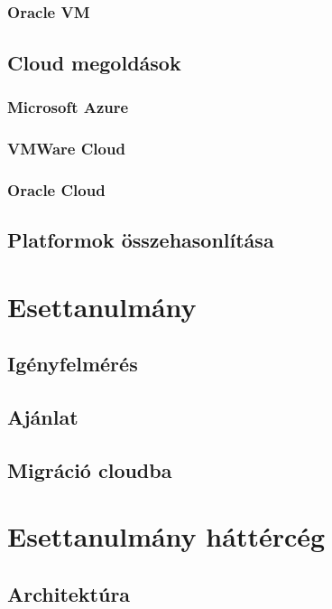 \documentclass[12pt,oneside,justify]{book}
\begin{document}
\subsection{Oracle\textsuperscript{\textregistered} VM}
\noindent

\section{Cloud megoldások}
\subsection{Microsoft Azure}
\noindent

\subsection{VMWare Cloud}
\noindent

\subsection{Oracle Cloud}
\noindent

\section{Platformok összehasonlítása}
\noindent

\chapter{Esettanulmány}
\section{Igényfelmérés}
\noindent

\section{Ajánlat}
\noindent

\section{Migráció cloudba}
\noindent

\chapter{Esettanulmány háttércég}

\section{Architektúra}
\end{document}

